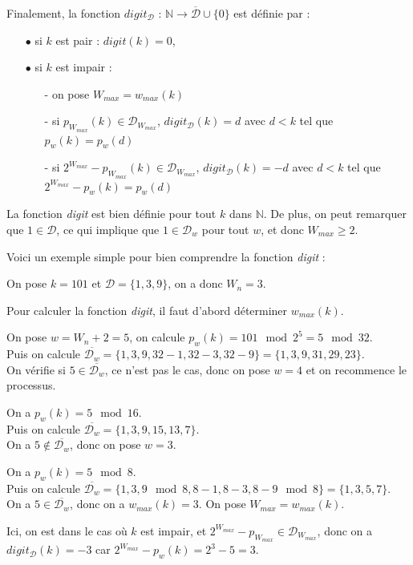 \documentclass[12pt, a4paper]{memoir}
\begin{document}
Finalement, la fonction $digit_{\mathcal{D}}$ : $\mathbb{N} \rightarrow \overline{\mathcal{D}} \cup \{0\}$ est définie par :

\begin{itemize}
 \item [$\bullet$] si $k$ est pair : $digit(k) = 0$,
 \item [$\bullet$] si $k$ est impair :
 \begin{itemize}
  \item [-] on pose $W_{max} = w_{max}(k)$
  \item [-] si $p_{W_{max}}(k) \in \mathcal{D}_{W_{max}}$, $digit_{\mathcal{D}}(k) = d$ avec $d < k$ tel que $p_w(k) = p_w(d)$
  \item [-] si $2^{W_{max}} - p_{W_{max}}(k) \in \mathcal{D}_{W_{max}}$, $digit_{\mathcal{D}}(k) = -d$ avec $d < k$ tel que $2^{W_{max}} - p_w(k) = p_w(d)$
 \end{itemize} 
\end{itemize}

La fonction \emph{digit} est bien définie pour tout $k$ dans $\mathbb{N}$.
De plus, on peut remarquer que $1 \in \mathcal{D}$, ce qui implique que $1 \in \mathcal{D}_w$
pour tout $w$, et donc $W_{max} \geq 2$.

Voici un exemple simple pour bien comprendre la fonction \emph{digit} :
\begin{Exemple}
 On pose $k = 101$ et $\mathcal{D} = \{1,3,9\}$, on a donc $W_n = 3$.
 
 Pour calculer la fonction \emph{digit}, il faut d'abord déterminer $w_{max}(k)$.
 
 On pose $w = W_n + 2 = 5$, on calcule $p_w (k) = 101 \mod 2^5 = 5 \mod 32$. \\
 Puis on calcule $\overline{\mathcal{D}_w} = \{1,3,9,32-1,32-3,32-9\} = \{1,3,9,31,29,23\}$. \\
 On vérifie si $5 \in \overline{\mathcal{D}_w}$, ce n'est pas le cas, donc on pose $w = 4$ et on recommence
 le processus.
 
 On a $p_w (k) = 5 \mod 16$. \\
 Puis on calcule $\overline{\mathcal{D}_w} = \{1,3,9,15,13,7\}$. \\
 On a $5 \notin \overline{\mathcal{D}_w}$, donc on pose $w = 3$.
 
 On a $p_w (k) = 5 \mod 8$. \\
 Puis on calcule $\overline{\mathcal{D}_w} = \{1,3,9 \mod 8,8-1,8-3,8-9 \mod 8\} = \{1,3,5,7\}$. \\
 On a $5 \in \overline{\mathcal{D}_w}$, donc on a $w_{max}(k) = 3$. On pose $W_{max} = w_{max}(k)$.
 
 Ici, on est dans le cas où $k$ est impair, et $2^{W_{max}} - p_{W_{max}} \in \mathcal{D}_{W_{max}}$,
 donc on a $digit_{\mathcal{D}}(k) = -3$ car $2^{W_{max}} - p_w(k) = 2^3 - 5 = 3$.
\end{Exemple}
\end{document}
